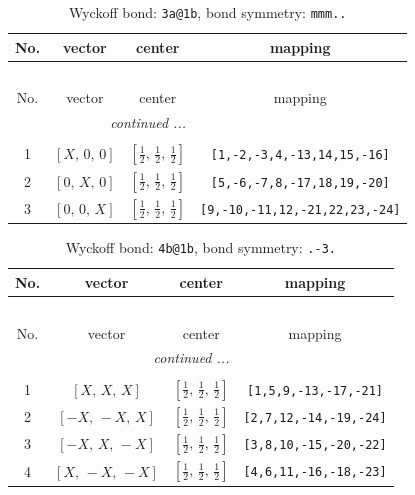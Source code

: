 \documentclass[fleqn,8pt]{jsarticle}
\begin{document}
\begin{longtable}{cccc}
\caption{Wyckoff bond: {\tt 3a@1b}, bond symmetry: {\tt mmm..}}
 \\
 \hline \hline
No. & vector & center & mapping \\ \hline \endfirsthead

\multicolumn{3}{l}{\tablename\ \thetable{}} \\
 \hline \hline
No. & vector & center & mapping \\ \hline \endhead

 \hline \hline
\multicolumn{3}{r}{\footnotesize\it continued ...} \\ \endfoot

 \hline \hline
\multicolumn{3}{r}{} \\ \endlastfoot

1 & $\left[ X,\, 0,\, 0 \right]$ & $\left[ \frac{1}{2},\, \frac{1}{2},\, \frac{1}{2} \right]$ & {\tt [1,-2,-3,4,-13,14,15,-16]} \\ \hline
2 & $\left[ 0,\, X,\, 0 \right]$ & $\left[ \frac{1}{2},\, \frac{1}{2},\, \frac{1}{2} \right]$ & {\tt [5,-6,-7,8,-17,18,19,-20]} \\ \hline
3 & $\left[ 0,\, 0,\, X \right]$ & $\left[ \frac{1}{2},\, \frac{1}{2},\, \frac{1}{2} \right]$ & {\tt [9,-10,-11,12,-21,22,23,-24]} \\
\end{longtable}
\renewcommand{\arraystretch}{1.2}
\begin{longtable}{cccc}
\caption{Wyckoff bond: {\tt 4b@1b}, bond symmetry: {\tt .-3.}}
 \\
 \hline \hline
No. & vector & center & mapping \\ \hline \endfirsthead

\multicolumn{3}{l}{\tablename\ \thetable{}} \\
 \hline \hline
No. & vector & center & mapping \\ \hline \endhead

 \hline \hline
\multicolumn{3}{r}{\footnotesize\it continued ...} \\ \endfoot

 \hline \hline
\multicolumn{3}{r}{} \\ \endlastfoot

1 & $\left[ X,\, X,\, X \right]$ & $\left[ \frac{1}{2},\, \frac{1}{2},\, \frac{1}{2} \right]$ & {\tt [1,5,9,-13,-17,-21]} \\ \hline
2 & $\left[ - X,\, - X,\, X \right]$ & $\left[ \frac{1}{2},\, \frac{1}{2},\, \frac{1}{2} \right]$ & {\tt [2,7,12,-14,-19,-24]} \\ \hline
3 & $\left[ - X,\, X,\, - X \right]$ & $\left[ \frac{1}{2},\, \frac{1}{2},\, \frac{1}{2} \right]$ & {\tt [3,8,10,-15,-20,-22]} \\ \hline
4 & $\left[ X,\, - X,\, - X \right]$ & $\left[ \frac{1}{2},\, \frac{1}{2},\, \frac{1}{2} \right]$ & {\tt [4,6,11,-16,-18,-23]} \\
\end{longtable}
\end{document}
